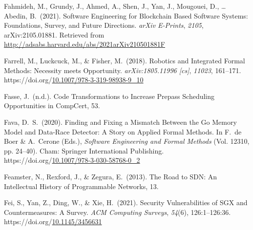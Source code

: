 \documentclass[12pt,twoside]{article}
\begin{document}
{\begin{thebibliography}{1079}
\mdbibitemlabel{}Fahmideh, M., Grundy, J., Ahmed, A., Shen, J., Yan, J., Mougouei, D., … Abedin, B.~(2021). Software Engineering for Blockchain Based Software Systems: Foundations, Survey, and Future Directions. \emph{arXiv E-Prints}, \emph{2105}, arXiv:2105.01881. Retrieved from \href{http://adsabs.harvard.edu/abs/2021arXiv210501881F}{{\ttfamily http://\hspace{0pt}adsabs.\hspace{0pt}harvard.\hspace{0pt}edu/\hspace{0pt}abs/\hspace{0pt}2021arXiv210501881F}}%

\mdbibitemlabel{}Farrell, M., Luckcuck, M., \& Fisher, M.~(2018). Robotics and Integrated Formal Methods: Necessity meets Opportunity. \emph{arXiv:1805.11996 {}[cs]}, \emph{11023}, 161–171. https://doi.org/\href{https://dx.doi.org/10.1007/978-3-319-98938-9_10}{10.1007/978-3-319-98938-9\_10}%

\mdbibitemlabel{}Fasse, J.~(n.d.). Code Transformations to Increase Prepass Scheduling Opportunities in CompCert, 53.%

\mdbibitemlabel{}Fava, D.~S.~(2020). Finding and Fixing a Mismatch Between the Go Memory Model and Data-Race Detector: A Story on Applied Formal Methods. In F.~de Boer \& A.~Cerone (Eds.), \emph{Software Engineering and Formal Methods} (Vol. 12310, pp. 24–40). Cham: Springer International Publishing. https://doi.org/\href{https://dx.doi.org/10.1007/978-3-030-58768-0_2}{10.1007/978-3-030-58768-0\_2}%

\mdbibitemlabel{}Feamster, N., Rexford, J., \& Zegura, E.~(2013). The Road to SDN: An Intellectual History of Programmable Networks, 13.%

\mdbibitemlabel{}Fei, S., Yan, Z., Ding, W., \& Xie, H.~(2021). Security Vulnerabilities of SGX and Countermeasures: A Survey. \emph{ACM Computing Surveys}, \emph{54}(6), 126:1–126:36. https://doi.org/\href{https://dx.doi.org/10.1145/3456631}{10.1145/3456631}%


\end{thebibliography}}
\end{document}
